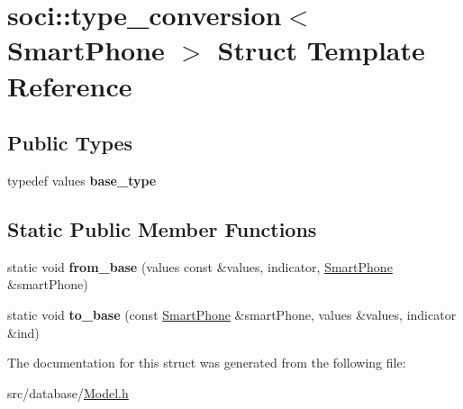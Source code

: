 \hypertarget{structsoci_1_1type__conversion_3_01_smart_phone_01_4}{\section{soci\-:\-:type\-\_\-conversion$<$ Smart\-Phone $>$ Struct Template Reference}
\label{structsoci_1_1type__conversion_3_01_smart_phone_01_4}
}
\subsection*{Public Types}
\begin{DoxyCompactItemize}
\item 
\hypertarget{structsoci_1_1type__conversion_3_01_smart_phone_01_4_ad05965450530e063d8ffaad59a0fdc43}{typedef values {\bfseries base\-\_\-type}}\label{structsoci_1_1type__conversion_3_01_smart_phone_01_4_ad05965450530e063d8ffaad59a0fdc43}

\end{DoxyCompactItemize}
\subsection*{Static Public Member Functions}
\begin{DoxyCompactItemize}
\item 
\hypertarget{structsoci_1_1type__conversion_3_01_smart_phone_01_4_a6bb36460915213766978a3bc4371fdb6}{static void {\bfseries from\-\_\-base} (values const \&values, indicator, \hyperlink{struct_smart_phone}{Smart\-Phone} \&smart\-Phone)}\label{structsoci_1_1type__conversion_3_01_smart_phone_01_4_a6bb36460915213766978a3bc4371fdb6}

\item 
\hypertarget{structsoci_1_1type__conversion_3_01_smart_phone_01_4_a6b556b9ce4d8ca10e61138d67d4cf571}{static void {\bfseries to\-\_\-base} (const \hyperlink{struct_smart_phone}{Smart\-Phone} \&smart\-Phone, values \&values, indicator \&ind)}\label{structsoci_1_1type__conversion_3_01_smart_phone_01_4_a6b556b9ce4d8ca10e61138d67d4cf571}

\end{DoxyCompactItemize}


The documentation for this struct was generated from the following file\-:\begin{DoxyCompactItemize}
\item 
src/database/\hyperlink{_model_8h}{Model.\-h}\end{DoxyCompactItemize}
